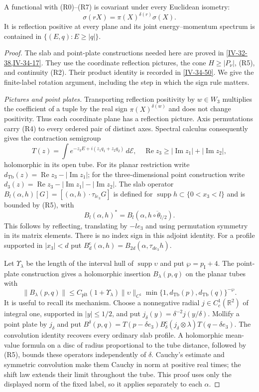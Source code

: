 \documentclass[11pt,letterpaper,reqno]{amsart}
\makeatletter
\theoremstyle{definition}
\newcommand{\ms@majorstart}{%
  \pushQED{\qed}\renewcommand{\qedsymbol}{$\blacksquare\square$}}
\newenvironment{theorem}[1][]{\ms@majorstart\ms@theorem[#1]}
  {\popQED\endms@theorem}
\theoremstyle{remark}
\makeatother
\begin{document}
\begin{theorem}[Finite-family rotation criterion]\label{C-389-30}
A functional with (R0)--(R7) is covariant under every
Euclidean isometry:
\[
 \sigma(rX)=\pi(X)^{\delta(r)}\sigma(X).
\]
It is reflection positive at every plane and its joint
energy--momentum spectrum is contained in
$\{(E,q):E\ge|q|\}$.
\end{theorem}

\begin{proof}
The slab and point-plate constructions needed here are proved
in \cref{IV-32-38,IV-34-17}. They use the coordinate reflection
pictures, the cone $H\ge|P_\nu|$, (R5), and continuity (R2).
Their product identity is recorded in
\eqref{IV-34-50}. We give the finite-label rotation argument,
including the step in which the sign rule matters.

\emph{Pictures and point plates.}
Transporting reflection positivity by $w\in W_3$
multiplies the coefficient of a tuple by the real sign
$\pi(X)^{\delta(w)}$ and does not change positivity.
Thus each coordinate plane has a reflection picture.
Axis permutations carry (R4) to every ordered pair of
distinct axes.  Spectral calculus consequently gives
the contraction semigroup
\[
 T(z)=\int e^{-z_3E+i(z_1q_1+z_2q_2)}\,d\mathscr E,
 \quad \operatorname{Re}z_3\ge
               |\operatorname{Im}z_1|+|\operatorname{Im}z_2|,
\]
holomorphic in its open tube.
For its planar restriction write
$d_{\mathrm{Tb}}(z)=\operatorname{Re}z_3-
|\operatorname{Im}z_1|$; for the three-dimensional
point construction write
$d_3(z)=\operatorname{Re}z_3-
|\operatorname{Im}z_1|-|\operatorname{Im}z_2|$.
The slab operator
$B_l(\alpha,h)[G]=[(\alpha,h)\cdot\tau_{le_3}G]$
is defined for $\operatorname{supp}h\subset\{0<x_3<l\}$
and is bounded by (R5), with
\[
 B_l(\alpha,h)^*=B_l(\alpha,\overline{h\circ\theta_{l/2}}).
\]
This follows by reflecting, translating by $-le_3$ and
using permutation symmetry in its matrix elements.
There is no index sign in this adjoint identity.
For a profile supported in $|x_3|<d$ put
$B_d^{\mathrm c}(\alpha,h)=
B_{2d}(\alpha,\tau_{de_3}h)$.

Let $\Upsilon_\lambda$ be the length of the interval
hull of $\operatorname{supp}\upsilon$ and put
$\wp=p_{\mathrm I}+4$.  The point-plate construction
gives a holomorphic insertion $B_\lambda(p,q)$ on
the planar tubes with
\[
 \|B_\lambda(p,q)\|\le
 C_{\mathrm{plt}}(1+\Upsilon_\lambda)
 \|\upsilon\|_{C^1}
 \min\{1,d_{\mathrm{Tb}}(p),d_{\mathrm{Tb}}(q)\}^{-\wp}.
\]
It is useful to recall its mechanism. Choose a nonnegative radial
$j\in C_c^1(\mathbb R^2)$ of integral one, supported in $|y|\le1/2$,
and put $j_\delta(y)=\delta^{-2}j(y/\delta)$.
Mollify a point plate by $j_\delta$ and put
$B^\delta(p,q)=T(p-\delta e_3)
B_\delta^{\mathrm c}(j_\delta\otimes\lambda)T(q-\delta e_3)$.
The convolution identity recovers every ordinary slab
profile.  A holomorphic mean-value formula on a disc
of radius proportional to the tube distance, followed
by (R5), bounds these operators independently of
$\delta$.  Cauchy's estimate and symmetric convolution
make them Cauchy in norm at positive real times;
the shift law extends their limit throughout the tube.
This proof uses only the displayed norm of the fixed
label, so it applies separately to each $\alpha$.


\end{proof}
\end{document}
